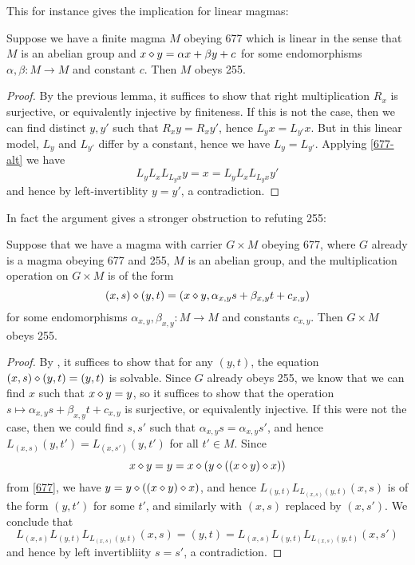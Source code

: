 This for instance gives the implication for linear magmas:

\begin{lemma}\label{linear-obstruction}  Suppose we have a finite magma $M$ obeying 677 which is linear in the sense that $M$ is an abelian group and $x \diamond y = \alpha x + \beta y + c$ for some endomorphisms $\alpha,\beta: M \to M$ and constant $c$.  Then $M$ obeys 255.
\end{lemma}

\begin{proof}  By the previous lemma, it suffices to show that right multiplication $R_x$ is surjective, or equivalently injective by finiteness.  If this is not the case, then we can find distinct $y,y'$ such that $R_x y = R_x y'$, hence $L_y x = L_{y'} x$. But in this linear model, $L_y$ and $L_{y'}$ differ by a constant, hence we have $L_y = L_{y'}$.  Applying \eqref{677-alt} we have
$$  L_y L_x L_{L_y x} y = x =  L_y L_x L_{L_y x} y'$$
and hence by left-invertiblity $y=y'$, a contradiction.
\end{proof}

In fact the argument gives a stronger obstruction to refuting 255:

\begin{lemma}\label{linear-2} Suppose that we have a magma with carrier $G \times M$ obeying 677, where $G$ already is a magma obeying 677 and 255, $M$ is an abelian group, and the multiplication operation on $G \times M$ is of the form
  $$ (x,s) \diamond (y,t) = (x \diamond y, \alpha_{x,y} s + \beta_{x,y} t + c_{x,y})$$
for some endomorphisms $\alpha_{x,y},\beta_{x,y}: M \to M$ and constants $c_{x,y}$.  Then $G \times M$ obeys 255.
\end{lemma}

\begin{proof}  By , it suffices to show that for any $(y,t)$, the equation $(x,s) \diamond (y,t) = (y,t)$ is solvable.  Since $G$ already obeys 255, we know that we can find $x$ such that $x \diamond y = y$, so it suffices to show that the operation $s \mapsto \alpha_{x,y} s + \beta_{x,y} t + c_{x,y}$ is surjective, or equivalently injective.  If this were not the case, then we could find $s,s'$ such that $\alpha_{x,y} s = \alpha_{x,y} s'$, and hence $L_{(x,s)} (y,t') = L_{(x,s')} (y,t')$ for all $t' \in M$.  Since
  $$ x \diamond y = y = x \diamond (y \diamond ((x \diamond y) \diamond x))$$
  from \eqref{677}, we have $y = y \diamond ((x \diamond y) \diamond x)$, and hence $L_{(y,t)} L_{L_{(x,s)} (y,t)} (x,s)$ is of the form $(y,t')$ for some $t'$, and similarly with $(x,s)$ replaced by $(x,s')$.  We conclude that
$$ L_{(x,s)} L_{(y,t)} L_{L_{(x,s)} (y,t)} (x,s) = (y,t) =
L_{(x,s)} L_{(y,t)} L_{L_{(x,s)} (y,t)} (x,s')$$
and hence by left invertibliity $s=s'$, a contradiction.
\end{proof}

